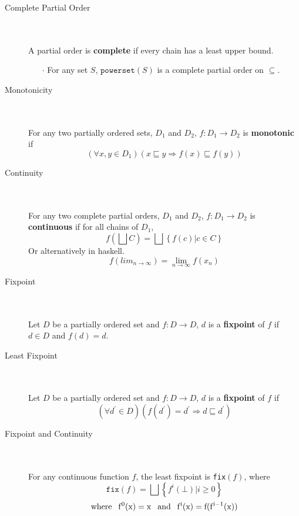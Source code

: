 \documentclass[12pt]{article}
\newcommand{\imp}{\textbf}
\newcommand{\state}[1]{\item[#1] \textcolor{white}{.} \\ \textcolor{white}{.} \\ }
\newcommand{\func}[3]{#1 : #2 \rightarrow #3}
\newcommand{\sse}{\sqsubseteq}
\newcommand{\point}[1]{\begin{itemize} \item[$\cdot$] #1 \end{itemize}}
\newcommand{\blank}{\textcolor{white}{-}}
\begin{document}
\begin{description}
\state{Complete Partial Order}
A partial order is \imp{complete} if every chain has a least upper bound.
\point{For any set $S$, $\texttt{powerset}(S)$ is a complete partial order on $\subseteq$.}

\state{Monotonicity}
For any two partially ordered sets, $D_1$ and $D_2$, $\func{f}{D_1}{D_2}$ is \imp{monotonic} if 
$$ (\forall x,y\in D_1)\left( x \sse y \Rightarrow f(x) \sse f(y) \right) $$

\state{Continuity}
For any two complete partial orders, $D_1$ and $D_2$, $\func{f}{D_1}{D_2}$ is \imp{continuous} if for all chains of $D_1$,
$$ f\left( \bigsqcup C \right) = \bigsqcup \left\{ f(c) | c \in C \right\} $$
Or alternatively in haskell.
$$ f (lim_{n \to \infty}) = \lim_{n \to \infty} f (x_n) $$

\state{Fixpoint}
Let $D$ be a partially ordered set and $\func{f}{D}{D}$,  $d$ is a \imp{fixpoint} of $f$ if $d \in D$ and $f(d)=d$.

\state{Least Fixpoint}
Let $D$ be a partially ordered set and $\func{f}{D}{D}$,  $d$ is a \imp{fixpoint} of $f$ if 
$$(\forall d^\prime \in D)(f(d^\prime) = d^\prime \Rightarrow d \sse d^\prime) $$

\state{Fixpoint and Continuity}
For any continuous function $f$, the least fixpoint is \texttt{fix}$(f)$, where
$$ \texttt{fix}(f) = \bigsqcup \left\{ f^i (\bot) | i \ge 0 \right\} $$
$$ \rm{where} \blank f^0(x) = x \blank \rm{and} \blank f^i(x) = f(f^{i-1}(x)) $$
\end{description}
\end{document}

